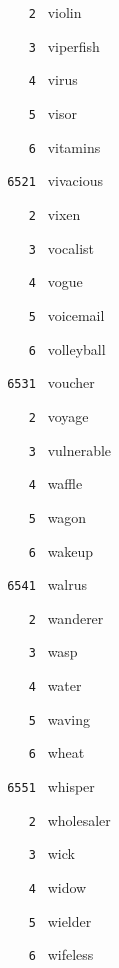 \documentclass[11pt]{article}
\begin{document}
\begin{multicols}{6}
\noindent \texttt{ \ \ \ 2 } violin  \par
\noindent \texttt{ \ \ \ 3 } viperfish  \par
\noindent \texttt{ \ \ \ 4 } virus  \par
\noindent \texttt{ \ \ \ 5 } visor  \par
\noindent \texttt{ \ \ \ 6 } vitamins  \par
\vspace{3mm}
\noindent \texttt{ 6521 } vivacious  \par
\noindent \texttt{ \ \ \ 2 } vixen  \par
\noindent \texttt{ \ \ \ 3 } vocalist  \par
\noindent \texttt{ \ \ \ 4 } vogue  \par
\noindent \texttt{ \ \ \ 5 } voicemail  \par
\noindent \texttt{ \ \ \ 6 } volleyball  \par
\vspace{3mm}
\noindent \texttt{ 6531 } voucher  \par
\noindent \texttt{ \ \ \ 2 } voyage  \par
\noindent \texttt{ \ \ \ 3 } vulnerable  \par
\noindent \texttt{ \ \ \ 4 } waffle  \par
\noindent \texttt{ \ \ \ 5 } wagon  \par
\noindent \texttt{ \ \ \ 6 } wakeup  \par
\vspace{3mm}
\noindent \texttt{ 6541 } walrus  \par
\noindent \texttt{ \ \ \ 2 } wanderer  \par
\noindent \texttt{ \ \ \ 3 } wasp  \par
\noindent \texttt{ \ \ \ 4 } water  \par
\noindent \texttt{ \ \ \ 5 } waving  \par
\noindent \texttt{ \ \ \ 6 } wheat  \par
\vspace{3mm}
\noindent \texttt{ 6551 } whisper  \par
\noindent \texttt{ \ \ \ 2 } wholesaler  \par
\noindent \texttt{ \ \ \ 3 } wick  \par
\noindent \texttt{ \ \ \ 4 } widow  \par
\noindent \texttt{ \ \ \ 5 } wielder  \par
\noindent \texttt{ \ \ \ 6 } wifeless  \par
\vspace{3mm}

\end{multicols}
\end{document}
